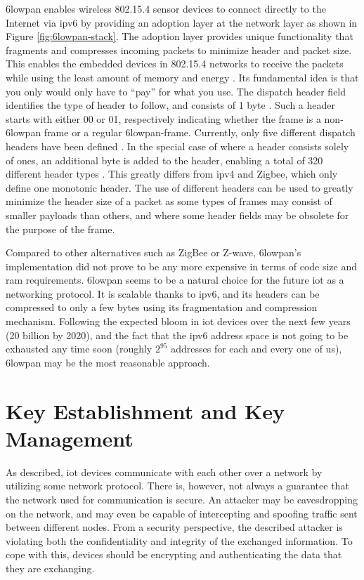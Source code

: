 \gls{6lowpan} enables wireless 802.15.4 sensor devices to connect directly to the Internet via \gls{ip}v6 by providing an adoption layer at the network layer as shown in Figure \ref{fig:6lowpan-stack}. The adoption layer provides unique functionality that fragments and compresses incoming packets to minimize header and packet size. This enables the embedded devices in 802.15.4 networks to receive the packets while using the least amount of memory and energy \cite{krentz20136lowpan}. Its fundamental idea is that you only would only have to ``pay'' for what you use. The dispatch header field identifies the type of header to follow, and consists of 1 byte \citep{Mulligan2007}. Such a header starts with either 00 or 01, respectively indicating whether the frame is a non-\gls{6lowpan} frame or a regular \gls{6lowpan}-frame. Currently, only five different dispatch headers have been defined \cite{rfc6282}. In the special case of where a header consists solely of ones, an additional byte is added to the header, enabling a total of 320 different header types \citep{Mulligan2007}. This greatly differs from \gls{ip}v4 and Zigbee, which only define one monotonic header. The use of different headers can be used to greatly minimize the header size of a packet as some types of frames may consist of smaller payloads than others, and where some header fields may be obsolete for the purpose of the frame.


Compared to other alternatives such as ZigBee or Z-wave, \gls{6lowpan}'s implementation did not prove to be any more expensive in terms of code size and \gls{ram} requirements. \gls{6lowpan} seems to be a natural choice for the future \gls{iot} as a networking protocol. It is scalable thanks to \gls{ip}v6, and its headers can be compressed to only a few bytes using its fragmentation and compression mechanism. Following the expected bloom in \gls{iot} devices over the next few years (20 billion by 2020), and the fact that the \gls{ip}v6 address space is not going to be exhausted any time soon (roughly $2^{95}$ addresses for each and every one of us), \gls{6lowpan} may be the most reasonable approach.

\section{Key Establishment and Key Management}
\label{sec:keyestablishment}

As described, \gls{iot} devices communicate with each other over a network by utilizing some network protocol. There is, however, not always a guarantee that the network used for communication is secure. An attacker may be eavesdropping on the network, and may even be capable of intercepting and spoofing traffic sent between different nodes. From a security perspective, the described attacker is violating both the confidentiality and integrity of the exchanged information. To cope with this, devices should be encrypting and authenticating the data that they are exchanging. 


